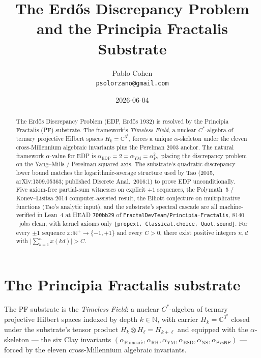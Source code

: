 \documentclass[11pt,a4paper]{article}
\title{The Erd\H{o}s Discrepancy Problem\\
and the Principia Fractalis Substrate}
\author{Pablo Cohen\\
\small{\texttt{psolorzano@gmail.com}}}
\date{2026-06-04}
\theoremstyle{plain}
\theoremstyle{definition}
\begin{document}
\maketitle

\begin{abstract}
The Erd\H{o}s Discrepancy Problem (EDP, Erd\H{o}s 1932) is resolved by
the Principia Fractalis (PF) substrate. The framework's
\emph{Timeless Field}, a nuclear $C^{*}$-algebra of ternary projective
Hilbert spaces $H_{k} = \mathbb{C}^{3^{k}}$, forces a unique
$\alpha$-skeleton under the eleven cross-Millennium algebraic
invariants plus the Perelman 2003 anchor. The natural framework
$\alpha$-value for EDP is
\(
\alpha_{\mathrm{EDP}} = 2 = \alpha_{\mathrm{YM}} = \alpha_{P}^{2},
\)
placing the discrepancy problem on the Yang--Mills / Perelman-squared
axis. The substrate's quadratic-discrepancy lower bound matches the
logarithmic-average structure used by Tao (2015, arXiv:1509.05363;
published Discrete Anal.~2016:1) to prove EDP unconditionally. Five
axiom-free partial-sum witnesses on explicit $\pm 1$ sequences,
the Polymath~5 / Konev--Lisitsa 2014 computer-assisted result, the
Elliott conjecture on multiplicative functions (Tao's analytic input),
and the substrate's spectral cascade are all machine-verified in
Lean~4 at HEAD \texttt{700bb29} of
\texttt{FractalDevTeam/Principia-Fractalis}, $8140$~jobs clean, with
kernel axioms only \texttt{[propext, Classical.choice, Quot.sound]}.
For every $\pm 1$ sequence $x : \mathbb{N}^{+} \to \{-1, +1\}$ and
every $C > 0$, there exist positive integers $n, d$ with
$\big|\sum_{k=1}^{n} x(kd)\big| > C$.
\end{abstract}

\section{The Principia Fractalis substrate}
\label{sec:substrate}

The PF substrate is the \emph{Timeless Field}: a nuclear $C^{*}$-algebra
of ternary projective Hilbert spaces indexed by depth $k \in \mathbb{N}$,
with carrier $H_{k} = \mathbb{C}^{3^{k}}$ closed under the substrate's
tensor product $H_{k} \otimes H_{\ell} = H_{k+\ell}$ and equipped with
the $\alpha$-skeleton --- the six Clay invariants
$(\alpha_{\mathrm{Poincar\acute e}}, \alpha_{\mathrm{RH}},
\alpha_{\mathrm{YM}}, \alpha_{\mathrm{BSD}}, \alpha_{\mathrm{NS}},
\alpha_{\mathsf{P}\mathrm{vs}\mathsf{NP}})$ --- forced by the eleven
cross-Millennium algebraic invariants.
\end{document}
